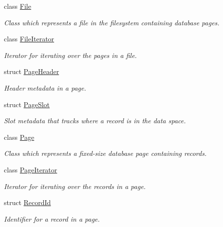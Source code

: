 \begin{DoxyCompactItemize}
class \hyperlink{classbadgerdb_1_1File}{File}
\begin{DoxyCompactList}\small\item\em Class which represents a file in the filesystem containing database pages. \end{DoxyCompactList}\item 
class \hyperlink{classbadgerdb_1_1FileIterator}{File\-Iterator}
\begin{DoxyCompactList}\small\item\em Iterator for iterating over the pages in a file. \end{DoxyCompactList}\item 
struct \hyperlink{structbadgerdb_1_1PageHeader}{Page\-Header}
\begin{DoxyCompactList}\small\item\em Header metadata in a page. \end{DoxyCompactList}\item 
struct \hyperlink{structbadgerdb_1_1PageSlot}{Page\-Slot}
\begin{DoxyCompactList}\small\item\em Slot metadata that tracks where a record is in the data space. \end{DoxyCompactList}\item 
class \hyperlink{classbadgerdb_1_1Page}{Page}
\begin{DoxyCompactList}\small\item\em Class which represents a fixed-\/size database page containing records. \end{DoxyCompactList}\item 
class \hyperlink{classbadgerdb_1_1PageIterator}{Page\-Iterator}
\begin{DoxyCompactList}\small\item\em Iterator for iterating over the records in a page. \end{DoxyCompactList}\item 
struct \hyperlink{structbadgerdb_1_1RecordId}{Record\-Id}
\begin{DoxyCompactList}\small\item\em Identifier for a record in a page. \end{DoxyCompactList}\end{DoxyCompactItemize}
